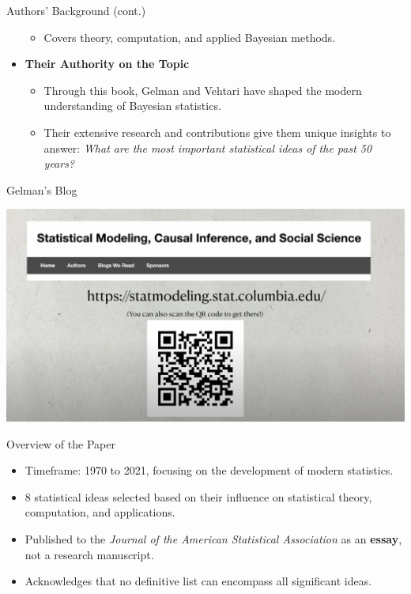 \documentclass{beamer}
\begin{document}
\begin{frame}{Authors' Background (cont.)}
\begin{minipage}{0.6\textwidth}
\begin{itemize}
\begin{itemize}
            \item Covers theory, computation, and applied Bayesian methods.
        \end{itemize}
        \vspace{0.5em} %
        \item \textbf{Their Authority on the Topic}
        \begin{itemize}
            \item Through this book, Gelman and Vehtari have shaped the modern understanding of Bayesian statistics.
            \item Their extensive research and contributions give them unique insights to answer: \textit{What are the most important statistical ideas of the past 50 years?}
        \end{itemize}
    \end{itemize}
\end{minipage}
\end{frame}



\begin{frame}{Gelman's Blog}
\begin{center}
    \includegraphics[width=\textwidth]{statistical_modeling_blog.png} %
\end{center}
\end{frame}


\begin{frame}{Overview of the Paper}
\begin{itemize}
    \item Timeframe: 1970 to 2021, focusing on the development of modern statistics.
    \item 8 statistical ideas selected based on their influence on statistical theory, computation, and applications.
    \item Published to the \textit{Journal of the American Statistical Association} as an \textbf{essay}, not a research manuscript.
            \item Acknowledges that no definitive list can encompass all significant ideas.
\end{itemize}
\end{frame}
\end{document}

